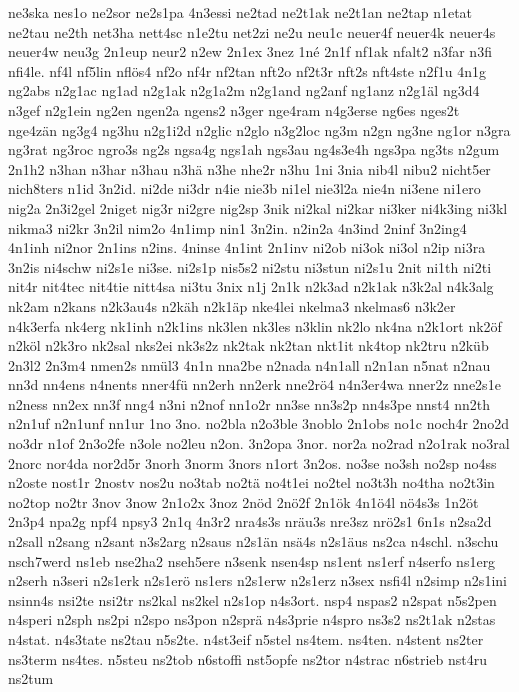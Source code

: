 {ne3ska
nes1o
ne2sor
ne2s1pa
4n3essi
ne2tad
ne2t1ak
ne2t1an
ne2tap
n1etat
ne2tau
ne2th
net3ha
nett4sc
n1e2tu
net2zi
ne2u
neu1c
neuer4f
neuer4k
neuer4s
neuer4w
neu3g
2n1eup
neur2
n2ew
2n1ex
3nez
1né
2n1f
nf1ak
nfalt2
n3far
n3fi
nfi4le.
nf4l
nf5lin
nflös4
nf2o
nf4r
nf2tan
nft2o
nf2t3r
nft2s
nft4ste
n2f1u
4n1g
ng2abs
n2g1ac
ng1ad
n2g1ak
n2g1a2m
n2g1and
ng2anf
ng1anz
n2g1äl
ng3d4
n3gef
n2g1ein
ng2en
ngen2a
ngens2
n3ger
nge4ram
n4g3erse
ng6es
nges2t
nge4zän
ng3g4
ng3hu
n2g1i2d
n2glic
n2glo
n3g2loc
ng3m
n2gn
ng3ne
ng1or
n3gra
ng3rat
ng3roc
ngro3s
ng2s
ngsa4g
ngs1ah
ngs3au
ng4s3e4h
ngs3pa
ng3ts
n2gum
2n1h2
n3han
n3har
n3hau
n3hä
n3he
nhe2r
n3hu
1ni
3nia
nib4l
nibu2
nicht5er
nich8ters
n1id
3n2id.
ni2de
ni3dr
n4ie
nie3b
ni1el
nie3l2a
nie4n
ni3ene
ni1ero
nig2a
2n3i2gel
2niget
nig3r
ni2gre
nig2sp
3nik
ni2kal
ni2kar
ni3ker
ni4k3ing
ni3kl
nikma3
ni2kr
3n2il
nim2o
4n1imp
nin1
3n2in.
n2in2a
4n3ind
2ninf
3n2ing4
4n1inh
ni2nor
2n1ins
n2ins.
4ninse
4n1int
2n1inv
ni2ob
ni3ok
ni3ol
n2ip
ni3ra
3n2is
ni4schw
ni2s1e
ni3se.
ni2s1p
nis5s2
ni2stu
ni3stun
ni2s1u
2nit
ni1th
ni2ti
nit4r
nit4tec
nit4tie
nitt4sa
ni3tu
3nix
n1j
2n1k
n2k3ad
n2k1ak
n3k2al
n4k3alg
nk2am
n2kans
n2k3au4s
n2käh
n2k1äp
nke4lei
nkelma3
nkelmas6
n3k2er
n4k3erfa
nk4erg
nk1inh
n2k1ins
nk3len
nk3les
n3klin
nk2lo
nk4na
n2k1ort
nk2öf
n2köl
n2k3ro
nk2sal
nks2ei
nk3s2z
nk2tak
nk2tan
nkt1it
nk4top
nk2tru
n2küb
2n3l2
2n3m4
nmen2s
nmül3
4n1n
nna2be
n2nada
n4n1all
n2n1an
n5nat
n2nau
nn3d
nn4ens
n4nents
nner4fü
nn2erh
nn2erk
nne2rö4
n4n3er4wa
nner2z
nne2s1e
n2ness
nn2ex
nn3f
nng4
n3ni
n2nof
nn1o2r
nn3se
nn3s2p
nn4s3pe
nnst4
nn2th
n2n1uf
n2n1unf
nn1ur
1no
3no.
no2bla
n2o3ble
3noblo
2n1obs
no1c
noch4r
2no2d
no3dr
n1of
2n3o2fe
n3ole
no2leu
n2on.
3n2opa
3nor.
nor2a
no2rad
n2o1rak
no3ral
2norc
nor4da
nor2d5r
3norh
3norm
3nors
n1ort
3n2os.
no3se
no3sh
no2sp
no4ss
n2oste
nost1r
2nostv
nos2u
no3tab
no2tä
no4t1ei
no2tel
no3t3h
no4tha
no2t3in
no2top
no2tr
3nov
3now
2n1o2x
3noz
2nöd
2nö2f
2n1ök
4n1ö4l
nö4s3s
1n2öt
2n3p4
npa2g
npf4
npsy3
2n1q
4n3r2
nra4s3s
nräu3s
nre3sz
nrö2s1
6n1s
n2sa2d
n2sall
n2sang
n2sant
n3s2arg
n2saus
n2s1än
nsä4s
n2s1äus
ns2ca
n4schl.
n3schu
nsch7werd
ns1eb
nse2ha2
nseh5ere
n3senk
nsen4sp
ns1ent
ns1erf
n4serfo
ns1erg
n2serh
n3seri
n2s1erk
n2s1erö
ns1ers
n2s1erw
n2s1erz
n3sex
nsfi4l
n2simp
n2s1ini
nsinn4s
nsi2te
nsi2tr
ns2kal
ns2kel
n2s1op
n4s3ort.
nsp4
nspas2
n2spat
n5s2pen
n4speri
n2sph
ns2pi
n2spo
ns3pon
n2sprä
n4s3prie
n4spro
ns3s2
ns2t1ak
n2stas
n4stat.
n4s3tate
ns2tau
n5s2te.
n4st3eif
n5stel
ns4tem.
ns4ten.
n4stent
ns2ter
ns3term
ns4tes.
n5steu
ns2tob
n6stoffi
nst5opfe
ns2tor
n4strac
n6strieb
nst4ru
ns2tum
}
